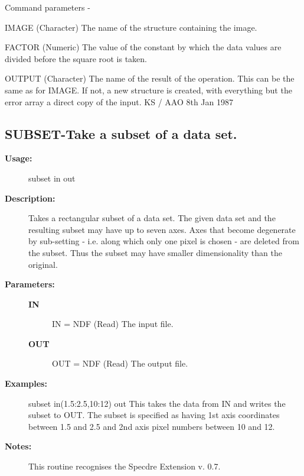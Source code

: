 \begin{description}
\begin{terminalv}
 Command parameters -

 IMAGE  (Character) The name of the structure containing the image.

 FACTOR (Numeric) The value of the constant by which the data
        values are divided before the square root is taken.

 OUTPUT (Character) The name of the result of the operation.  This
        can be the same as for IMAGE.  If not, a new structure
        is created, with everything but the error array a direct
        copy of the input.
                                  KS / AAO 8th Jan 1987
\end{terminalv}
\end{description}
\subsection{SUBSET-\label{SUBSET}Take a subset of a data set.}
\begin{description}

\item [\textbf{Usage:}]

   subset in out


\item [\textbf{Description:}]

   Takes a rectangular subset of a data set. The given data set and
   the resulting subset may have up to seven axes. Axes that become
   degenerate by sub-setting - i.e. along which only one pixel is
   chosen - are deleted from the subset. Thus the subset may have
   smaller dimensionality than the original.

\item [\textbf{Parameters:}]
\begin{description}
\item [\textbf{IN}]
IN = NDF (Read)
   The input file.
\item [\textbf{OUT}]
OUT = NDF (Read)
   The output file.
\end{description}

\item [\textbf{Examples:}]
\begin{terminalv}
subset in(1.5:2.5,10:12) out
   This takes the data from IN and writes the subset to OUT. The
   subset is specified as having 1st axis coordinates between 1.5
   and 2.5 and 2nd axis pixel numbers between 10 and 12.
\end{terminalv}

\item [\textbf{Notes:}]
This routine recognises the Specdre Extension v. 0.7.
\end{description}
